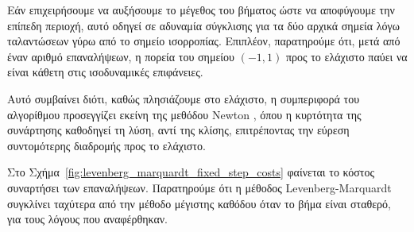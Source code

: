 \documentclass[a4paper,12pt]{article}
\begin{document}
Εάν επιχειρήσουμε να αυξήσουμε το μέγεθος του βήματος ώστε να αποφύγουμε την επίπεδη περιοχή, αυτό οδηγεί σε αδυναμία 
σύγκλισης για τα δύο αρχικά σημεία λόγω ταλαντώσεων γύρω από το σημείο ισορροπίας. Επιπλέον, παρατηρούμε ότι, μετά 
από έναν αριθμό επαναλήψεων, η πορεία του σημείου $(-1, 1)$ προς το ελάχιστο παύει να είναι κάθετη στις ισοδυναμικές 
επιφάνειες. 

Αυτό συμβαίνει διότι, καθώς πλησιάζουμε στο ελάχιστο, η συμπεριφορά του αλγορίθμου προσεγγίζει εκείνη της μεθόδου 
 Newton , όπου η κυρτότητα της συνάρτησης καθοδηγεί τη λύση, αντί της
κλίσης, επιτρέποντας την εύρεση συντομότερης διαδρομής προς το ελάχιστο.

Στο Σχήμα~\ref{fig:levenberg_marquardt_fixed_step_costs} φαίνεται το κόστος συναρτήσει των επαναλήψεων. Παρατηρούμε
ότι η μέθοδος  Levenberg-Marquardt  συγκλίνει ταχύτερα από την μέθοδο 
μέγιστης καθόδου όταν το βήμα είναι σταθερό, για τους λόγους που αναφέρθηκαν.
\end{document}
